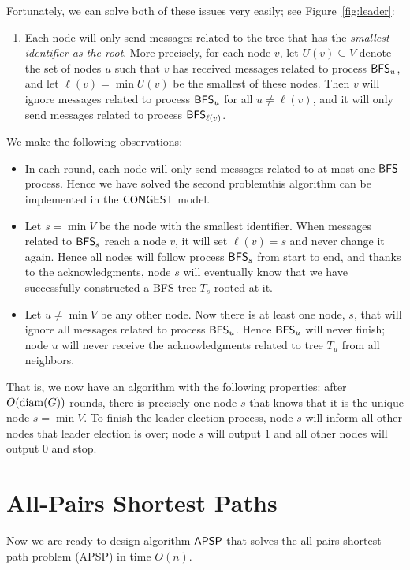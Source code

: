Fortunately, we can solve both of these issues very easily; see Figure~\ref{fig:leader}:
\begin{enumerate}[resume]
    \item Each node will only send messages related to the tree that has the \emph{smallest identifier as the root}. More precisely, for each node $v$, let $U(v) \subseteq V$ denote the set of nodes $u$ such that $v$ has received messages related to process $\textup{\sffamily BFS}_u$, and let $\ell(v) = \min U(v)$ be the smallest of these nodes. Then $v$ will ignore messages related to process $\textup{\sffamily BFS}_u$ for all $u \ne \ell(v)$, and it will only send messages related to process $\textup{\sffamily BFS}_{\ell(v)}$.
\end{enumerate}
We make the following observations:
\begin{itemize}
    \item In each round, each node will only send messages related to at most one $\textup{\sffamily BFS}$ process. Hence we have solved the second problem\mydash this algorithm can be implemented in the $\textup{\sffamily CONGEST}$ model.
    \item Let $s = \min V$ be the node with the smallest identifier. When messages related to $\textup{\sffamily BFS}_s$ reach a node $v$, it will set $\ell(v) = s$ and never change it again. Hence all nodes will follow process $\textup{\sffamily BFS}_s$ from start to end, and thanks to the acknowledgments, node $s$ will eventually know that we have successfully constructed a BFS tree $T_s$ rooted at it.
    \item Let $u \ne \min V$ be any other node. Now there is at least one node, $s$, that will ignore all messages related to process $\textup{\sffamily BFS}_u$. Hence $\textup{\sffamily BFS}_u$ will never finish; node $u$ will never receive the acknowledgments related to tree $T_u$ from all neighbors.
\end{itemize}
That is, we now have an algorithm with the following properties: after $O(\operatorname{diam}(G))$ rounds, there is precisely one node $s$ that knows that it is the unique node $s = \min V$. To finish the leader election process, node $s$ will inform all other nodes that leader election is over; node $s$ will output $1$ and all other nodes will output $0$ and stop.


\section{All-Pairs Shortest Paths}\label{sec:apsp}

Now we are ready to design algorithm $\textup{\sffamily APSP}$ that solves the all-pairs shortest path problem (APSP) in time $O(n)$.

